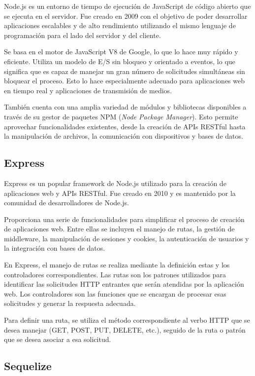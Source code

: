 Node.js \cite{WEBSITE:nodejs} es un entorno de tiempo de ejecución de JavaScript de código abierto que se ejecuta en el servidor. Fue creado en 2009 con el objetivo de poder desarrollar aplicaciones escalables y de alto rendimiento utilizando el mismo lenguaje de programación para el lado del servidor y del cliente.

Se basa en el motor de JavaScript V8 de Google, lo que lo hace muy rápido y eficiente. Utiliza un modelo de E/S sin bloqueo y orientado a eventos, lo que significa que es capaz de manejar un gran número de solicitudes simultáneas sin bloquear el proceso. Esto lo hace especialmente adecuado para aplicaciones web en tiempo real y aplicaciones de transmisión de medios.

También cuenta con una amplia variedad de módulos y bibliotecas disponibles a través de su gestor de paquetes NPM (\textit{Node Package Manager}). Esto permite aprovechar funcionalidades existentes, desde la creación de APIs RESTful hasta la manipulación de archivos, la comunicación con dispositivos y bases de datos.

\subsection{Express}
\label{subsec:express}

Express \cite{WEBSITE:express} es un popular framework de Node.js utilizado para la creación de aplicaciones web y APIs RESTful. Fue creado en 2010 y es mantenido por la comunidad de desarrolladores de Node.js.

Proporciona una serie de funcionalidades para simplificar el proceso de creación de aplicaciones web. Entre ellas se incluyen el manejo de rutas, la gestión de middleware, la manipulación de sesiones y cookies, la autenticación de usuarios y la integración con bases de datos.

En Express, el manejo de rutas se realiza mediante la definición estas y los controladores correspondientes. Las rutas son los patrones utilizados para identificar las solicitudes HTTP entrantes que serán atendidas por la aplicación web. Los controladores son las funciones que se encargan de procesar esas solicitudes y generar la respuesta adecuada.

Para definir una ruta, se utiliza el método correspondiente al verbo HTTP que se desea manejar (GET, POST, PUT, DELETE, etc.), seguido de la ruta o patrón que se desea asociar a esa solicitud. 

\subsection{Sequelize}
\label{subsec:sequelize}

